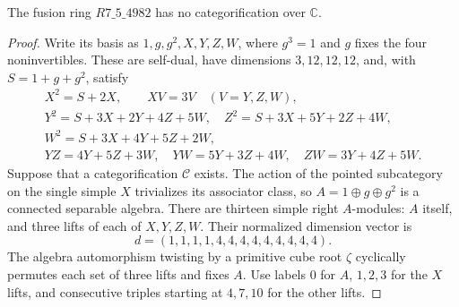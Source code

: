 \begin{proposition}\label{prop:m5-4982-exclusion}
The fusion ring $R7\_5\_4982$ has no categorification over $\mathbb C$.
\end{proposition}
\begin{proof}
Write its basis as $1,g,g^2,X,Y,Z,W$, where $g^3=1$ and $g$ fixes
the four noninvertibles. These are self-dual, have dimensions
$3,12,12,12$, and, with $S=1+g+g^2$, satisfy
\[
\begin{gathered}
 X^2=S+2X,\qquad XV=3V\quad(V=Y,Z,W),\\
 Y^2=S+3X+2Y+4Z+5W,\quad
 Z^2=S+3X+5Y+2Z+4W,\\
 W^2=S+3X+4Y+5Z+2W,\\
 YZ=4Y+5Z+3W,\quad YW=5Y+3Z+4W,\quad
 ZW=3Y+4Z+5W.
\end{gathered}
\]
Suppose that a categorification $\mathcal C$ exists.
The action of the pointed subcategory on the single simple $X$
trivializes its associator class, so
$A=1\oplus g\oplus g^2$ is a connected separable algebra.
There are thirteen simple right $A$-modules: $A$ itself, and three
lifts of each of $X,Y,Z,W$. Their normalized dimension vector is
\[
 d=(1,1,1,1,4,4,4,4,4,4,4,4,4).
\]
The algebra automorphism twisting by a primitive cube root
$\zeta$ cyclically permutes each set of three lifts and fixes $A$.
Use labels $0$ for $A$, $1,2,3$ for the $X$ lifts, and consecutive
triples starting at $4,7,10$ for the other lifts.


\end{proof}
